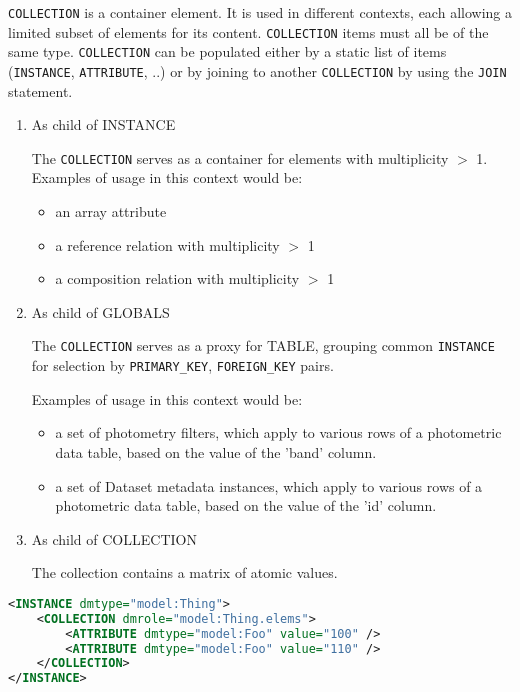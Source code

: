     \texttt{COLLECTION} is a container element.  It is used in different contexts, each allowing a limited subset of elements for its content. 
     \texttt{COLLECTION} items must all be of the same type.
    \texttt{COLLECTION} can be populated either by a static list of items (\texttt{INSTANCE}, \texttt{ATTRIBUTE}, ..) or by joining to another \texttt{COLLECTION} by using the \texttt{JOIN} statement.    
    
    \begin{enumerate}
    \item{As child of INSTANCE}
      
      The \texttt{COLLECTION} serves as a container for elements with multiplicity $>$ 1.\\
      Examples of usage in this context would be:
      \begin{itemize}
        \item an array attribute
        \item a reference relation with multiplicity $>$ 1
        \item a composition relation with multiplicity $>$ 1
      \end{itemize}
      
    \item{As child of GLOBALS}
          
      The \texttt{COLLECTION} serves as a proxy for TABLE, grouping common \texttt{INSTANCE}  for selection by \texttt{PRIMARY\_KEY}, \texttt{FOREIGN\_KEY} pairs.
      
      Examples of usage in this context would be:
      \begin{itemize}
        \item a set of photometry filters, which apply to various rows of a photometric data table, based on the value of the 'band' column.
        \item a set of Dataset metadata instances, which apply to various rows of a photometric data table, based on the value of the 'id' column.
      \end{itemize}
          
    \item{As child of COLLECTION}
    
	The collection contains a matrix of  atomic values.
        
    \end{enumerate}
   
\begin{lstlisting}[caption={Example of \texttt{COLLECTION} child of \texttt{INSTANCE}.},language=XML]
<INSTANCE dmtype="model:Thing">
    <COLLECTION dmrole="model:Thing.elems">
        <ATTRIBUTE dmtype="model:Foo" value="100" />
        <ATTRIBUTE dmtype="model:Foo" value="110" />
    </COLLECTION>
</INSTANCE>
\end{lstlisting}   

